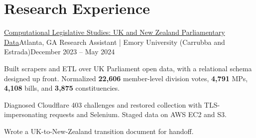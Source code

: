 \resumeSubHeadingListEnd

\section{Research Experience}
\resumeSubHeadingListStart

  \resumeSubheading
    {\href{https://github.com/JunyiZhou-Conny/Comput-Leg-UK-NZ}{Computational Legislative Studies: UK and New Zealand Parliamentary Data}}{Atlanta, GA}
    {Research Assistant | Emory University (Carrubba and Estrada)}{December 2023 -- May 2024}
    \resumeItemListStart
      \item Built scrapers and ETL over UK Parliament open data, with a relational schema designed up front. Normalized \textbf{22,606} member-level division votes, \textbf{4,791} MPs, \textbf{4,108} bills, and \textbf{3,875} constituencies.
      \item Diagnosed Cloudflare 403 challenges and restored collection with TLS-impersonating requests and Selenium. Staged data on AWS EC2 and S3.
      \item Wrote a UK-to-New-Zealand transition document for handoff.
    \resumeItemListEnd

\resumeSubHeadingListEnd


